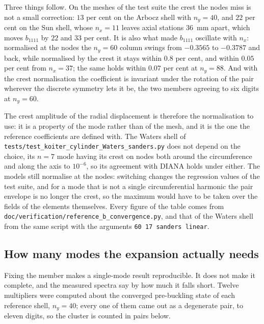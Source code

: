 \documentclass[11pt,a4paper]{article}
\begin{document}
Three things follow.  On the meshes of the test suite the crest the nodes
miss is not a small correction: $13$ per cent on the Arbocz shell with
$n_y = 40$, and $22$ per cent on the Sun shell, whose $n_x = 11$ leaves axial
stations $36$~mm apart, which moves $b_{1111}$ by $22$ and $33$ per cent.
It is also what made $b_{1111}$ oscillate with $n_x$: normalised at the nodes
the $n_y = 60$ column swings from $-0.3565$ to $-0.3787$ and back, while
normalised by the crest it stays within $0.8$ per cent, and within $0.05$ per
cent from $n_x = 37$; the same holds within $0.07$ per cent at $n_y = 88$.
And with the crest normalisation the coefficient is invariant under the
rotation of the pair wherever the discrete symmetry lets it be, the two
members agreeing to six digits at $n_y = 60$.

The crest amplitude of the radial displacement is therefore the normalisation
to use: it is a property of the mode rather than of the mesh, and it is the
one the reference coefficients are defined with.  The Waters shell of
\texttt{tests/test\_koiter\_cylinder\_Waters\_sanders.py} does not depend on
the choice, its $n = 7$ mode having its crest on nodes both around the
circumference and along the axis to $10^{-6}$, so its agreement with DIANA
holds under either.  The models still normalise at the nodes: switching
changes the regression values of the test suite, and for a mode that is not a
single circumferential harmonic the pair envelope is no longer the crest, so
the maximum would have to be taken over the fields of the elements themselves.
Every figure of the table comes from
\texttt{doc/verification/reference\_b\_convergence.py}, and that of the
Waters shell from the same script with the arguments
\texttt{60 17 sanders linear}.

\subsection{How many modes the expansion actually needs}
\label{sec:howmany}

Fixing the member makes a single-mode result reproducible.  It does not make
it complete, and the measured spectra say by how much it falls short.  Twelve
multipliers were computed about the converged pre-buckling state of each
reference shell, $n_y = 40$; every one of them came out as a degenerate pair,
to eleven digits, so the cluster is counted in pairs below.
\end{document}
